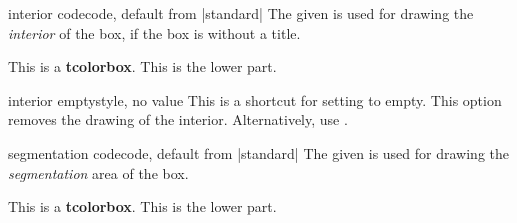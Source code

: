 \clearpage
\begin{docTcbKey}{interior code}{}{code, default from |standard|}
  The given  is used
  for drawing the \emph{interior} of the box, if the box is without a title.%
\begin{dispExample}

\begin{tcolorbox}[enhanced,interior code={
  \path[draw=red!5!white,line width=5mm,line cap=round]
    ([xshift=3mm,yshift=-3mm]interior.north west)
    --([xshift=-3mm,yshift=3mm]interior.south east)
    ([xshift=3mm,yshift=3mm]interior.south west)
    --([xshift=-3mm,yshift=-3mm]interior.north east);}]
This is a \textbf{tcolorbox}.
\tcblower
This is the lower part.
\end{tcolorbox}
\end{dispExample}
\end{docTcbKey}

\begin{docTcbKey}{interior empty}{}{style, no value}
  This is a shortcut for setting   to empty.
  This option removes the drawing of the interior.
  Alternatively, use .
\end{docTcbKey}


\begin{docTcbKey}{segmentation code}{}{code, default from |standard|}
  The given  is used for drawing the
  \emph{segmentation} area of the box.%
\begin{dispExample}

\begin{tcolorbox}[enhanced,title=My title,segmentation code={
  \path[top color=red!5!white,bottom color=red!5!white,middle color=blue]
  (segmentation.south west) rectangle (segmentation.north east);}]
This is a \textbf{tcolorbox}.
\tcblower
This is the lower part.
\end{tcolorbox}
\end{dispExample}
\end{docTcbKey}


